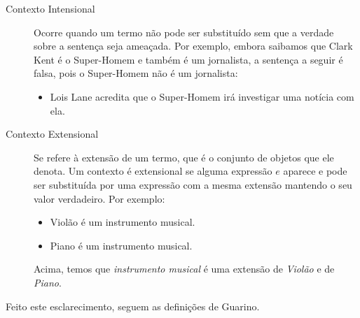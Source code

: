\begin{description}
	\item[Contexto Intensional] Ocorre quando um termo não pode ser substituído sem que a verdade sobre a sentença seja ameaçada. Por exemplo, embora saibamos que Clark Kent é o Super-Homem e também é um jornalista, a sentença a seguir é falsa, pois o Super-Homem não é um jornalista:
	\begin{itemize}
		\item Lois Lane acredita que o Super-Homem irá investigar uma notícia com ela. 
	\end{itemize}
	\item[Contexto Extensional] Se refere à extensão de um termo, que é o conjunto de objetos que ele denota. Um contexto é extensional se alguma expressão $ e $ aparece e pode ser substituída por uma expressão com a mesma extensão mantendo o seu valor verdadeiro. Por exemplo: 
	\begin{itemize}
		\item Violão é um instrumento musical.
		\item Piano é um instrumento musical.
	\end{itemize}
	Acima, temos que \textit{instrumento musical} é uma extensão de \textit{Violão} e de \textit{Piano}.	
\end{description}

Feito este esclarecimento, seguem as definições de Guarino.

